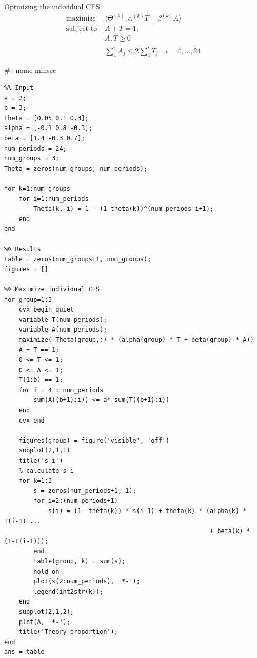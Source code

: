 \documentclass[11pt]{article}
\begin{document}
Optmizing the individual CES:
  \begin{align}
  \text{maximize} \; & \langle \Theta^{(k)}, \alpha^{(k)} T + \beta^{(k)} A \rangle \\
  \text{subject to} \; & A + T = 1,
    \\& A, T \ge 0
    \\& \sum_4^i A_j \le  2 \sum_4^i T_j \quad i = 4, \ldots, 24
\end{align}

\#+name minsec
\begin{verbatim}
%% Input
a = 2;
b = 3;
theta = [0.05 0.1 0.3];
alpha = [-0.1 0.8 -0.3];
beta = [1.4 -0.3 0.7];
num_periods = 24;
num_groups = 3;
Theta = zeros(num_groups, num_periods);

for k=1:num_groups
    for i=1:num_periods
        Theta(k, i) = 1 - (1-theta(k))^(num_periods-i+1);
    end
end

%% Results
table = zeros(num_groups+1, num_groups);
figures = []

%% Maximize individual CES
for group=1:3
    cvx_begin quiet
    variable T(num_periods);
    variable A(num_periods);
    maximize( Theta(group,:) * (alpha(group) * T + beta(group) * A))
    A + T == 1;
    0 <= T <= 1;
    0 <= A <= 1;
    T(1:b) == 1;
    for i = 4 : num_periods
        sum(A((b+1):i)) <= a* sum(T((b+1):i))
    end
    cvx_end

    figures(group) = figure('visible', 'off')
    subplot(2,1,1)
    title('s_i')
    % calculate s_i
    for k=1:3
        s = zeros(num_periods+1, 1);
        for i=2:(num_periods+1)
            s(i) = (1- theta(k)) * s(i-1) + theta(k) * (alpha(k) * T(i-1) ...
                                                        + beta(k) * (1-T(i-1)));
        end
        table(group, k) = sum(s);
        hold on
        plot(s(2:num_periods), '*-');
        legend(int2str(k));
    end
    subplot(2,1,2);
    plot(A, '*-');
    title('Theory proportion');
end
ans = table
\end{verbatim}
\end{document}
